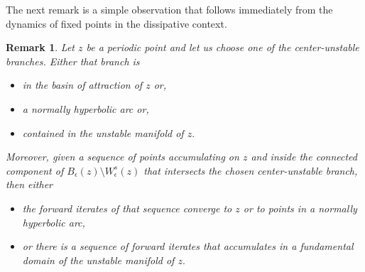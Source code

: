 \documentclass[a4paper,11pt]{article}
\newtheorem{remark}[lemma]{Remark}
\theoremstyle{definition}
\def\La{\Lambda}
\def\e{\epsilon}
\def\La{\Lambda}
\begin{document}
    

The next remark is a simple observation  that follows immediately from the dynamics of fixed points in the dissipative context. 

\begin{remark}\label{att-NH} Let $z$ be a periodic point  and let us choose one of the center-unstable branches. Either that branch is

\begin{itemize}
    \item[--]in the basin of attraction of $z$ or,

    \item[--] a normally hyperbolic arc or, 

    \item[--] contained in the unstable manifold of $z.$
\end{itemize} 
Moreover, given a sequence of points accumulating on $z$ and inside the connected component of $B_\e(z)\setminus W^s_\e(z)$ that intersects the chosen center-unstable branch, then either 


\begin{itemize}
    \item[--]the forward iterates of that sequence converge to $z$  or to points in a  normally hyperbolic arc,

    \item[--] or there is a sequence of forward iterates that accumulates in a fundamental domain of the unstable manifold of $z.$
\end{itemize} 
 
    
\end{remark}

\end{document}
